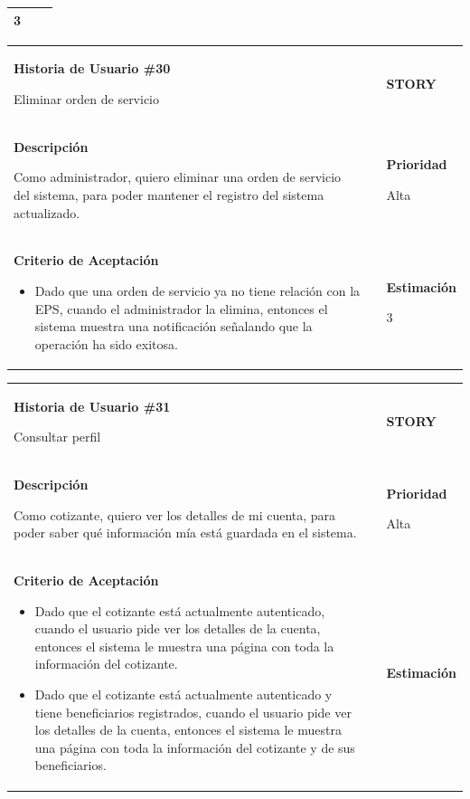 \documentclass[12pt,a4paper]{article}
\begin{document}
\begin{center}
\begin{tabular}{| p{10cm} c p{2.5cm}|}
3 \\ 
\hline 
\end{tabular}
\vspace{5mm}

\begin{tabular}{| p{10cm} c p{2.5cm}|}
\hline 
\textbf{Historia de Usuario \#30}

Eliminar orden de servicio & & \textbf{{\Large STORY}} \\ 
\textbf{Descripción}

Como administrador, quiero eliminar una orden de servicio del sistema, para
poder mantener el registro del sistema actualizado. &  & \textbf{Prioridad}

Alta\\

\textbf{Criterio de Aceptación}

\begin{itemize}
\item Dado que una orden de servicio ya no tiene relación con la EPS, cuando el
administrador la elimina, entonces el sistema muestra una
notificación señalando que la operación ha sido exitosa.
\end{itemize} & & \textbf{Estimación}

3 \\ 
\hline 
\end{tabular}
\vspace{5mm}

\begin{tabular}{| p{10cm} c p{2.5cm}|}
\hline 
\textbf{Historia de Usuario \#31}

Consultar perfil & & \textbf{{\Large STORY}} \\ 
\textbf{Descripción}

Como cotizante, quiero ver los detalles de mi cuenta, para poder saber
qué información mía está guardada en el sistema. &  & \textbf{Prioridad}

Alta\\

\textbf{Criterio de Aceptación}

\begin{itemize}
\item Dado que el cotizante está actualmente autenticado, cuando el
usuario pide ver los detalles de la cuenta, entonces el sistema le
muestra una página con toda la información del cotizante.
\item Dado que el cotizante está actualmente autenticado y tiene
beneficiarios registrados, cuando el usuario pide ver los detalles
de la cuenta, entonces el sistema le muestra una página con toda
la información del cotizante y de sus beneficiarios.
\end{itemize} & & \textbf{Estimación}


\end{tabular}
\end{center}
\end{document}
